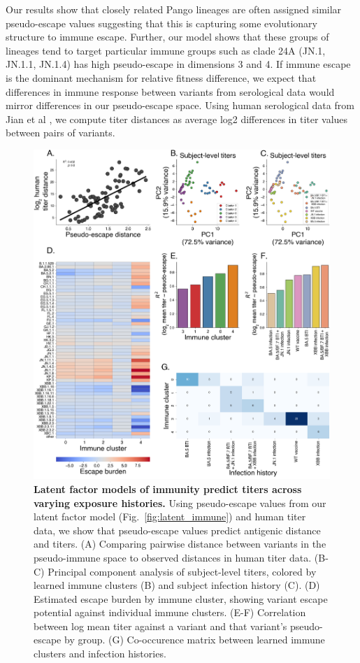 \documentclass[11pt,oneside,letterpaper]{article}
\begin{document}
Our results show that closely related Pango lineages are often assigned similar pseudo-escape values suggesting that this is capturing some evolutionary structure to immune escape.
Further, our model shows that these groups of lineages tend to target particular immune groups such as clade 24A (JN.1, JN.1.1, JN.1.4) has high pseudo-escape in dimensions 3 and 4.
If immune escape is the dominant mechanism for relative fitness difference, we expect that differences in immune response between variants from serological data would mirror differences in our pseudo-escape space.
Using human serological data from Jian et al \cite{Jian2023}, we compute titer distances as average log2 differences in titer values between pairs of variants.

\begin{figure}[h]
    \centering
    \includegraphics[width=1.0\linewidth]{./figures/latent-immune-structure.png}
    \caption{
      \textbf{Latent factor models of immunity predict titers across varying exposure histories.}
      Using pseudo-escape values from our latent factor model (Fig.~\ref{fig:latent_immune}) and human titer data, we show that pseudo-escape values predict antigenic distance and titers.
      (A) Comparing pairwise distance between variants in the pseudo-immune space to observed distances in human titer data.
      (B-C) Principal component analysis of subject-level titers, colored by learned immune clusters (B) and subject infection history (C).
      (D) Estimated escape burden by immune cluster, showing variant escape potential against individual immune clusters.
      (E-F) Correlation between log mean titer against a variant and that variant's pseudo-escape by group.
      (G) Co-occurence matrix between learned immune clusters and infection histories.
    }
    \label{fig:latent_immune_structure}
\end{figure}
\end{document}
